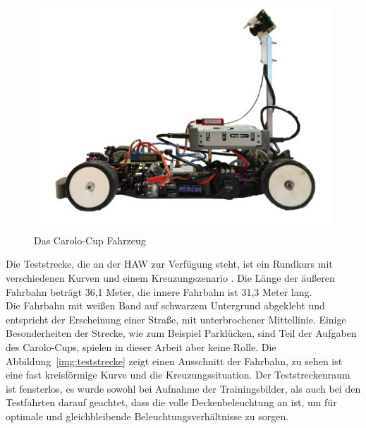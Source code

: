 \begin{figure}[h]
	\centering
	\includegraphics[scale=0.3]{figures/Fahrzeug.png}
	\caption{Das Carolo-Cup Fahrzeug}
	\label{img:Carolo-Fahrzeug}
\end{figure}

Die Teststrecke, die an der HAW zur Verfügung steht, ist ein Rundkurs mit verschiedenen Kurven und einem Kreuzungszenario . Die Länge der äußeren Fahrbahn beträgt 36,1 Meter, die innere Fahrbahn ist 31,3 Meter lang.\\
Die Fahrbahn mit weißen Band auf schwarzem Untergrund abgeklebt und entspricht der Erscheinung einer Straße, mit unterbrochener Mittellinie. Einige Besonderheiten der Strecke, wie zum Beispiel Parklücken, sind Teil der Aufgaben des Carolo-Cups, spielen in dieser Arbeit aber keine Rolle.
Die Abbildung~\ref{img:teststrecke} zeigt einen Ausschnitt der Fahrbahn, zu sehen ist eine fast kreisförmige Kurve und die Kreuzungssituation. 
Der Teststreckenraum ist fensterlos, es wurde sowohl bei Aufnahme der Trainingsbilder, als auch bei den Testfahrten darauf geachtet, dass die volle Deckenbeleuchtung an ist, um für optimale und gleichbleibende Beleuchtungsverhältnisse zu sorgen.

